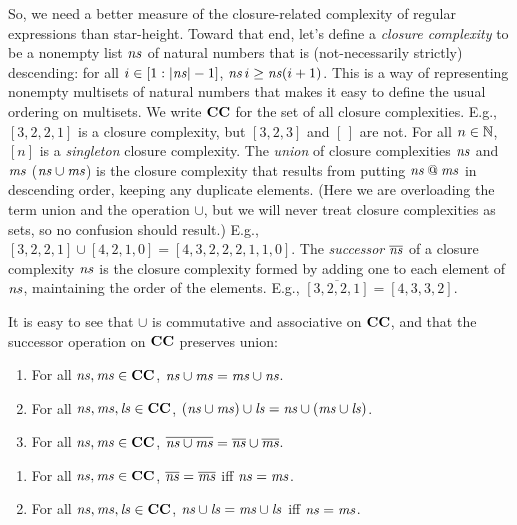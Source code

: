So, we need a better measure of the closure-related complexity of
regular expressions than star-height.  Toward that end, let's define a
\emph{closure complexity} to be a nonempty list ${\it ns}$ of natural
%
%
numbers that is (not-necessarily strictly) descending: for all
$i\in[1:|{\it ns}|-1]$, ${\it ns}\,i\geq {\it ns}(i+1)$.  This is a way of
representing nonempty multisets of natural numbers that makes it easy
to define the usual ordering on multisets. We write $\mathbf{CC}$ for the set
%
of all closure complexities. E.g., $[3, 2, 2, 1]$ is a closure
complexity, but $[3, 2, 3]$ and $[\,]$ are not.  For all $n\in\mathbb{N}$,
$[n]$ is a \emph{singleton} closure complexity.  The \emph{union} of
closure complexities ${\it ns}$ and ${\it ms}$ (${\it ns}\cup{\it ms}$) is the closure
complexity that results from putting ${\it ns}\mathbin{@}{\it ms}$ in descending
order, keeping any duplicate elements.  (Here we are overloading the
term union and the operation $\cup$, but we will never treat closure
complexities as sets, so no confusion should result.)  E.g.,
$[3,2,2,1]\cup[4,2,1,0] = [4,3,2,2,2,1,1,0]$.  The \emph{successor}
$\overline{{\it ns}}$ of a closure complexity ${\it ns}$ is the closure
complexity formed by adding one to each element of ${\it ns}$, maintaining
the order of the elements.  E.g., $\overline{[3,2,2,1]} = [4,3,3,2]$.

It is easy to see that $\cup$ is commutative and associative on $\mathbf{CC}$,
and that the successor operation on $\mathbf{CC}$ preserves union:

\begin{proposition}
\begin{enumerate}[\quad(1)]
\item For all ${\it ns},{\it ms}\in\mathbf{CC}$, ${\it ns}\cup{\it ms} = {\it ms}\cup{\it ns}$.

\item For all ${\it ns},{\it ms},{\it ls}\in\mathbf{CC}$, $({\it ns}\cup{\it ms})\cup{\it ls} = {\it ns}\cup({\it ms}\cup{\it ls})$.

\item For all ${\it ns},{\it ms}\in\mathbf{CC}$, $\overline{{\it ns}\cup{\it ms}} =
  \overline{{\it ns}}\cup\overline{{\it ms}}$.
\end{enumerate}
\end{proposition}

\begin{proposition}
\begin{enumerate}[\quad(1)]
\label{CCEquivContext}
\item For all ${\it ns},{\it ms}\in\mathbf{CC}$, $\overline{{\it ns}} = \overline{{\it ms}}$ iff
  ${\it ns}={\it ms}$.

\item For all ${\it ns},{\it ms},{\it ls}\in\mathbf{CC}$, ${\it ns}\cup{\it ls} = {\it ms}\cup{\it ls}$ iff
  ${\it ns} = {\it ms}$.
\end{enumerate}
\end{proposition}

